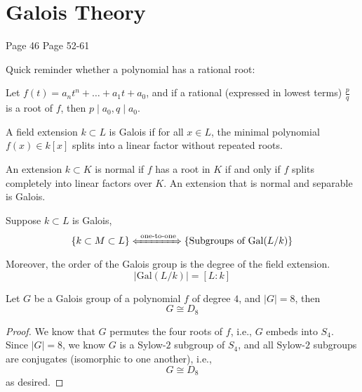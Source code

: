 \chapter{Galois Theory}
Page 46
Page 52-61



Quick reminder whether a polynomial has a rational root:
\begin{prop}
    Let $f(t)=a_nt^n+\dots+a_1t+a_0$, and if a rational (expressed in lowest terms) $\frac{p}{q}$ is a root of $f$, then $p\mid a_0, q\mid a_0$.
\end{prop}


\begin{defn}
    A field extension $k\subset L$ is Galois if for all $x\in L$, the minimal polynomial $f(x)\in k[x]$ splits into a linear factor without repeated roots.
\end{defn}
\begin{defn}
    An extension $k\subset K$ is normal if $f$ has a root in $K$ if and only if $f$ splits completely into linear factors over $K$. An extension that is normal and separable is Galois.
\end{defn}

\begin{thm}
    Suppose $k\subset L$ is Galois, 
    \begin{equation*}
        \left\{ k\subset M\subset L\right\} \xLeftrightarrow{\text{ one-to-one}} \left\{\text{Subgroups of Gal}(L/k) \right\}
    \end{equation*}
    Moreover, the order of the Galois group is the degree of the field extension.
    \begin{equation*}
        \left|\text{Gal}(L/k)\right|=[L:k]
    \end{equation*}
\end{thm}



\begin{prop}
    Let $G$ be a Galois group of a polynomial $f$ of degree $4$, and $|G|=8$, then 
    \begin{equation*}
        G\cong D_8
    \end{equation*}
\end{prop}
\begin{proof}
    We know that $G$ permutes the four roots of $f$, i.e., $G$ embeds into $S_4$. Since $|G|=8$, we know $G$ is a Sylow-$2$ subgroup of $S_4$, and all Sylow-$2$ subgroups are conjugates (isomorphic to one another), i.e., 
    \begin{equation*}
        G\cong D_8
    \end{equation*}
    as desired.
\end{proof}

